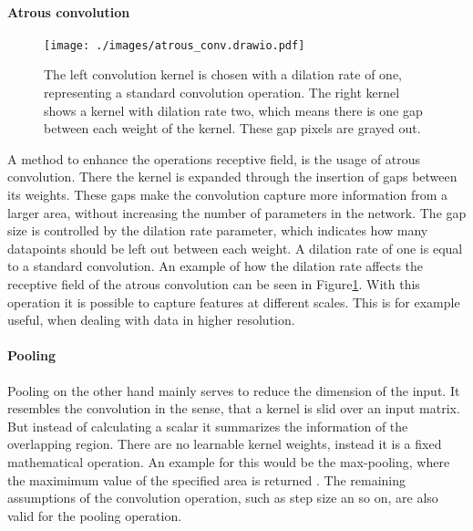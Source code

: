 \paragraph{Atrous convolution}
\begin{figure}[tb]
    \begin{center}
    \texttt{[image: ./images/atrous\_conv.drawio.pdf]}
    \caption[Atrous convolution]{{The left convolution kernel is chosen with a dilation rate of one, representing a standard convolution operation.
    The right kernel shows a kernel with dilation rate two, which means there is one gap between each weight of the kernel. 
    These gap pixels are grayed out.}\label{atrous_conv_fig}}
    \end{center}
\end{figure}
A method to enhance the operations receptive field, is the usage of atrous convolution.
There the kernel is expanded through the insertion of gaps between its weights.
These gaps make the convolution capture more information from a larger area, without increasing the number of parameters in the network.
The gap size is controlled by the dilation rate parameter, which indicates how many datapoints should be left out between each weight.
A dilation rate of one is equal to a standard convolution.
An example of how the dilation rate affects the receptive field of the atrous convolution can be seen in Figure\ref{atrous_conv_fig}.
With this operation it is possible to capture features at different scales.
This is for example useful, when dealing with data in higher resolution\cite{Chen2017}.
\paragraph{Pooling}
Pooling on the other hand mainly serves to reduce the dimension of the input. 
It resembles the convolution in the sense, that a kernel is slid over an input matrix. 
But instead of calculating a scalar it summarizes the information of the overlapping region.
There are no learnable kernel weights, instead it is a fixed mathematical operation.
An example for this would be the max-pooling, where the maximimum value of the specified area is returned \cite{Ajit2020}.
The remaining assumptions of the convolution operation, such as step size an so on, are also valid for the pooling operation. 
